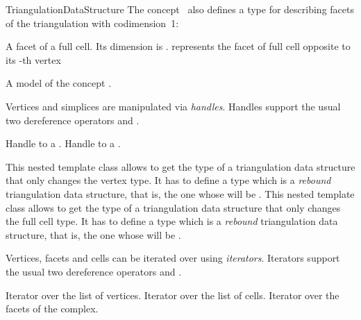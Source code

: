 \begin{ccRefConcept}{TriangulationDataStructure}
The concept \ccRefName\ also defines a type for describing facets of the
triangulation with codimension~1:

{A facet of a full cell. Its dimension is
.  represents the facet of
full cell  opposite to its -th vertex}

{A model of the concept .}

Vertices and simplices are manipulated via \emph{handles}. Handles support the
usual two dereference operators  and .

{
Handle to a .
}
\ccGlue
{}
{
Handle to a .
}

\begin{ccAdvanced}
{This nested template class allows to get the type of a triangulation
data structure that only changes the vertex type.  It has to define a type
 which is a {\it rebound} triangulation data structure, that is, the
one whose  will be .}
\ccGlue
{}
{This nested template class allows to get the type of a triangulation
data structure that only changes the full cell type.  It has to define a type
 which is a {\it rebound} triangulation data structure, that is, the
one whose  will be .}
\end{ccAdvanced}


Vertices, facets and cells can be iterated over using \emph{iterators}.
Iterators support the usual two dereference operators  and
.

{
Iterator over the list of vertices.
}
\ccGlue
{}
{
Iterator over the list of cells.
}
\ccGlue
{}
{
Iterator over the facets of the complex.
}


\end{ccRefConcept}
